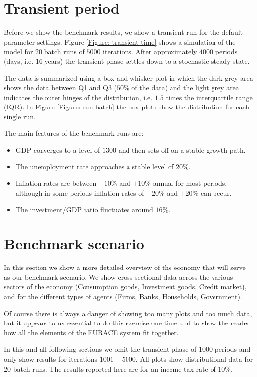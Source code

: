 \section{Transient period}
Before we show the benchmark results, we show a transient run for the default parameter settings.
Figure \ref{Figure: transient time} shows a simulation of the model for $20$ batch runs of $5000$ iterations.
After approximately $4000$ periods (days, i.e. 16 years) the transient phase settles down to a stochastic steady state.

The data is summarized using a box-and-whisker plot in which the dark grey area shows the data between Q1 and Q3 ($50\%$ of the data) and
 the light grey area indicates the outer hinges of the distribution, i.e. $1.5$ times the interquartile range (IQR).
In Figure \ref{Figure: run batch} the box plots show the distribution for each single run.

\bigskip
The main features of the benchmark runs are:
\begin{itemize}
\item GDP converges to a level of $1300$ and then sets off on a stable growth path.
\item The unemployment rate approaches a stable level of $20\%$.
\item Inflation rates are between $-10\%$ and $+10\%$ annual for most periods,
although in some periods inflation rates of $-20\%$ and $+20\%$ can occur.
\item The investment/GDP ratio fluctuates around $16\%$.
\end{itemize}

\section{Benchmark scenario}
In this section we show a more detailed overview of the economy that will serve as our benchmark scenario.
We show cross sectional data across the various sectors of the economy (Consumption goods, Investment goods, Credit market),
and for the different types of agents (Firms, Banks, Households, Government). 

Of course there is always a danger of showing too many plots and too much data,
but it appears to us essential to do this exercise one time and to show the reader how
all the elements of the EURACE system fit together.

In this and all following sections we omit the transient phase of $1000$ periods and only show results for iterations $1001-5000$.
All plots show distributional data for $20$ batch runs. The results reported here are for an income tax rate of $10\%$.


